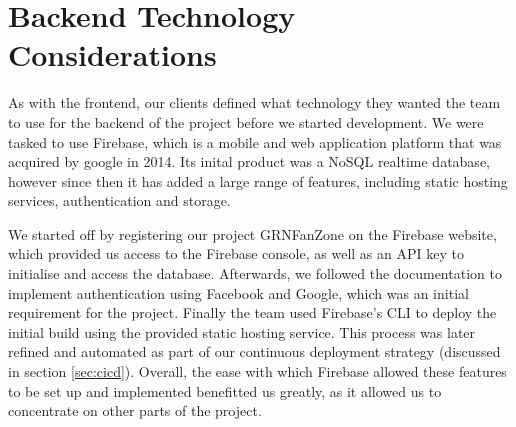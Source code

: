 \documentclass{l3proj}
\begin{document}


\section{Backend Technology Considerations} %
\label{sec:backend}

As with the frontend, our clients defined what technology they wanted the team
 to use for the backend of the project before we started development. We were
 tasked to use Firebase, which is a mobile and web application platform that
 was acquired by google in 2014. Its inital product was a NoSQL realtime database,
 however since then it has added a large range of features, including static
 hosting services, authentication and storage.

We started off by registering our project GRNFanZone on the Firebase website,
 which provided us access to the Firebase console, as well as an API key to
 initialise and access the database. Afterwards, we followed the documentation
 to implement authentication using Facebook and Google, which was an initial
 requirement for the project. Finally the team used Firebase's CLI to deploy
 the initial build using the provided static hosting service. This process
 was later refined and automated as part of our continuous deployment strategy
 (discussed in section \ref{sec:cicd}). Overall, the ease with which Firebase
 allowed these features to be set up and implemented benefitted us greatly,
 as it allowed us to concentrate on other parts of the project.
\end{document}

